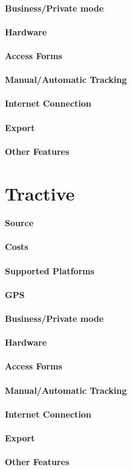 \paragraph{Business/Private mode}
\paragraph{Hardware}
\paragraph{Access Forms}
\paragraph{Manual/Automatic Tracking}
\paragraph{Internet Connection}
\paragraph{Export}
\paragraph{Other Features}
\newpage
\section{Tractive}
\paragraph{Source} 
\paragraph{Costs} 
\paragraph{Supported Platforms} 
\paragraph{GPS} 
\paragraph{Business/Private mode}
\paragraph{Hardware}
\paragraph{Access Forms}
\paragraph{Manual/Automatic Tracking}
\paragraph{Internet Connection}
\paragraph{Export}
\paragraph{Other Features}

